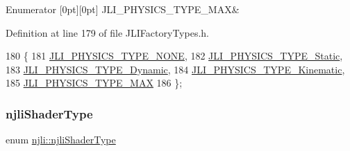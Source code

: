 \begin{DoxyEnumFields}{Enumerator}
[0pt][0pt]{}\mbox{\label{namespacenjli_a60ba626f4609f81870c92d042c6bc83daa31c43643127eda16677fad48c2048a5}} 
J\+L\+I\+\_\+\+P\+H\+Y\+S\+I\+C\+S\+\_\+\+T\+Y\+P\+E\+\_\+\+M\+AX&\\
\hline

\end{DoxyEnumFields}


Definition at line 179 of file J\+L\+I\+Factory\+Types.\+h.


\begin{DoxyCode}
180   \{
181     \mbox{\hyperlink{namespacenjli_a60ba626f4609f81870c92d042c6bc83da0e2cec62028cea9b741b85f27c16cbd4}{JLI\_PHYSICS\_TYPE\_NONE}},
182     \mbox{\hyperlink{namespacenjli_a60ba626f4609f81870c92d042c6bc83da5a2d85916f9bc2ccd65950cec856e9df}{JLI\_PHYSICS\_TYPE\_Static}},
183     \mbox{\hyperlink{namespacenjli_a60ba626f4609f81870c92d042c6bc83dadb14b0bcd262551a09de40aed7cc9ecb}{JLI\_PHYSICS\_TYPE\_Dynamic}},
184     \mbox{\hyperlink{namespacenjli_a60ba626f4609f81870c92d042c6bc83da7752eb033d5277c2716329a0ba25c9c9}{JLI\_PHYSICS\_TYPE\_Kinematic}},
185     \mbox{\hyperlink{namespacenjli_a60ba626f4609f81870c92d042c6bc83daa31c43643127eda16677fad48c2048a5}{JLI\_PHYSICS\_TYPE\_MAX}}
186   \};
\end{DoxyCode}
\mbox{\label{namespacenjli_a8f2b6cfac9213576c34bcf711ac39fbd}} 
\subsubsection{\texorpdfstring{njli\+Shader\+Type}{njliShaderType}}
{\footnotesize\ttfamily enum \mbox{\hyperlink{namespacenjli_a8f2b6cfac9213576c34bcf711ac39fbd}{njli\+::njli\+Shader\+Type}}}


